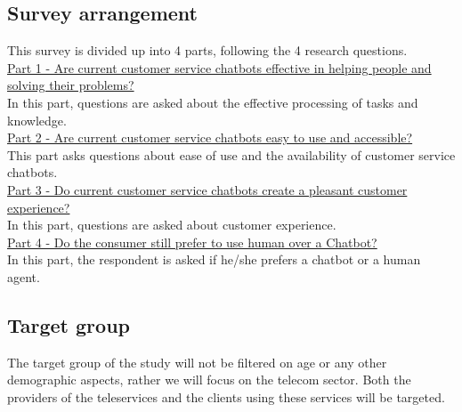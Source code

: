 \subsection{Survey arrangement}
This survey is divided up into 4 parts, following the 4 research questions.\\
\break
\ul{Part 1 - Are current customer service chatbots effective in helping people and solving their problems?}\\
In this part, questions are asked about the effective processing of tasks and knowledge.\\
\break
\ul{Part 2 - Are current customer service chatbots easy to use and accessible?}\\
This part asks questions about ease of use and the availability of customer service chatbots.\\
\break
\ul{Part 3 - Do current customer service chatbots create a pleasant customer experience?}\\
In this part, questions are asked about customer experience.\\
\break
\ul{Part 4 - Do the consumer still prefer to use human over a Chatbot?}\\
In this part, the respondent is asked if he/she prefers a chatbot or a human agent.\\ 

\subsection{Target group}
The target group of the study will not be filtered on age or any other demographic aspects, rather we will focus on the telecom sector. Both the providers of the teleservices and the clients using these services will be targeted.